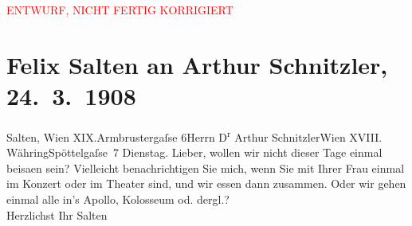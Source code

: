 
\begin{center}
            \textcolor{red}{ENTWURF, NICHT FERTIG KORRIGIERT}
                      \end{center}
            
         
         \renewcommand{\erwaehntePersonen}{Personen: Olga Schnitzler}
         \renewcommand{\erwaehnteOrte}{Orte: Apollo-Theater, Armbrustergasse, Colosseum, Edmund-Weiß-Gasse, I., Innere Stadt, Wien, XIX., Döbling, XVIII., Währing}
         \renewcommand{\erwaehnteWerke}{}
               \section[Felix Salten an Arthur Schnitzler, 24. 3. 1908]{ Felix Salten an Arthur Schnitzler, 24. 3. 1908}\nopagebreak{}\rehead{ }\begin{ledgroupsized}[t]{13cm}\normalsize\beginnumbering \toendnotes[C]{\smallbreak\pagebreak[2]} 
\toendnotes[C]{\smallbreak}\pstart{}{\pb}Salten, Wien XIX.\pend{}\pstart{}Armbrustergaſse 6\pend{}{\bigskip}\pstart{}Herrn D\textsuperscript{r} Arthur Schnitzler\pend{}\pstart{}Wien XVIII. Währing\pend{}\pstart{}Spöttelgaſse 7\pend{}{\bigskip}\pstart
           \raggedleft{}{\pb}Dienstag. \pend
           \pstart{}Lieber,\pend\pstart
           wollen wir nicht dieser Tage einmal beisa{\geminationm}en sein? Vielleicht benachrichtigen
               Sie mich, wenn Sie mit Ihrer Frau einmal im Konzert oder im Theater sind, und wir essen dann zusammen.
               Oder wir gehen einmal alle in’s Apollo, Kolosseum od. dergl.? {\\}Herzlichst\pend
           \pstart Ihr \spacefill\mbox{Salten}\pend{}
         
         \endnumbering{}\end{ledgroupsized}\begin{anhang}\end{anhang}\newcommand{\dateiname}{L03493}\newcommand{\titel}{Felix Salten an Arthur Schnitzler, 24. 3. 1908}\newcommand{\editorInnen}{Martin Anton Müller und Laura Untner}
      
